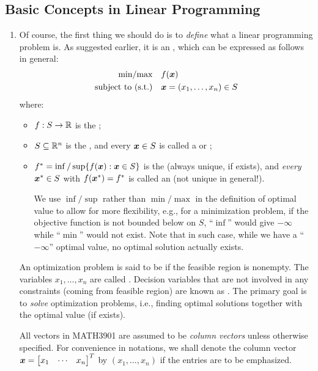 \subsection{Basic Concepts in Linear Programming}
\label{subsect:lp-basic-cocnepts}
\begin{enumerate}
\item Of course, the first thing we should do is to \emph{define} what a linear
programming problem is. As suggested earlier, it is an , which can be expressed as follows in general:
\begin{align*}
\text{min/max}\quad&f(\bm{x}) \\
\text{subject to (s.t.)}\quad&\bm{x}=(x_1,\dotsc,x_n)\in S
\end{align*}
where:
\begin{itemize}
\item \(f:S\to\mathbb{R}\) is the ;
\item \(S\subseteq \mathbb{R}^n\) is the , and every \(\bm{x}\in S\) is called a  or ;
\item \(f^*=\inf/\sup\{f(\bm{x}):\bm{x}\in S\}\) is the  (always unique, if exists), and \emph{every}
\(\bm{x}^{*}\in S\) with \(f(\bm{x}^{*})=f^{*}\) is called an
 (not unique in general!).
\begin{note}
We use \(\inf/\sup\) rather than \(\min/\max\) in the definition of optimal
value to allow for more flexibility, e.g., for a minimization problem, if the
objective function is not bounded below on \(S\), ``\(\inf\)'' would give
\(-\infty\) while ``\(\min\)'' would not exist. Note that in such case, while
we have a ``\(-\infty\)'' optimal value, no optimal solution actually exists.
\end{note}
\end{itemize}
An optimization problem is said to be  if the feasible region is
nonempty. The variables \(x_1,\dotsc,x_n\) are called .  Decision variables that are not involved in any constraints
(coming from feasible region) are known as . The primary
goal is to \emph{solve} optimization problems, i.e., finding optimal solutions
together with the optimal value (if exists).

All vectors in MATH3901 are assumed to be \emph{column vectors} unless
otherwise specified. For convenience in notations, we shall denote the column
vector \(\bm{x}= \begin{bmatrix}x_1&\cdots&x_n\end{bmatrix}^{T}\) by
\((x_1,\dotsc,x_n)\) if the entries are to be emphasized.


\end{enumerate}
